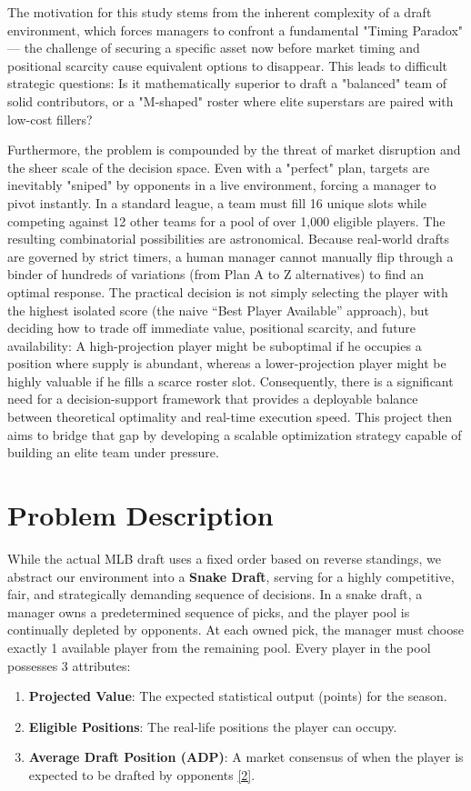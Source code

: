 \documentclass[11pt,a4paper]{article}
\begin{document}
The motivation for this study stems from the inherent complexity of a draft environment, which forces managers to confront a fundamental "Timing Paradox" — the challenge of securing a specific asset now before market timing and positional scarcity cause equivalent options to disappear. This leads to difficult strategic questions: Is it mathematically superior to draft a "balanced" team of solid contributors, or a "M-shaped" roster where elite superstars are paired with low-cost fillers?

Furthermore, the problem is compounded by the threat of market disruption and the sheer scale of the decision space. Even with a "perfect" plan, targets are inevitably "sniped" by opponents in a live environment, forcing a manager to pivot instantly. In a standard league, a team must fill 16 unique slots while competing against 12 other teams for a pool of over 1,000 eligible players. The resulting combinatorial possibilities are astronomical. Because real-world drafts are governed by strict timers, a human manager cannot manually flip through a binder of hundreds of variations (from Plan A to Z alternatives) to find an optimal response. The practical decision is not simply selecting the player with the highest isolated score (the naive ``Best Player Available'' approach), but deciding how to trade off immediate value, positional scarcity, and future availability: A high-projection player might be suboptimal if he occupies a position where supply is abundant, whereas a lower-projection player might be highly valuable if he fills a scarce roster slot. Consequently, there is a significant need for a decision-support framework that provides a deployable balance between theoretical optimality and real-time execution speed. This project then aims to bridge that gap by developing a scalable optimization strategy capable of building an elite team under pressure.

\section{Problem Description}

While the actual MLB draft uses a fixed order based on reverse standings, we abstract our environment into a \textbf{Snake Draft}, serving for a highly competitive, fair, and strategically demanding sequence of decisions. In a snake draft, a manager owns a predetermined sequence of picks, and the player pool is continually depleted by opponents. At each owned pick, the manager must choose exactly 1 available player from the remaining pool. Every player in the pool possesses 3 attributes:
\begin{enumerate}
    \item \textbf{Projected Value}: The expected statistical output (points) for the season.
    \item \textbf{Eligible Positions}: The real-life positions the player can occupy.
    \item \textbf{Average Draft Position (ADP)}: A market consensus of when the player is expected to be drafted by opponents \hyperref[ref:fantasypros-adp]{[2]}.
\end{enumerate}
\end{document}
